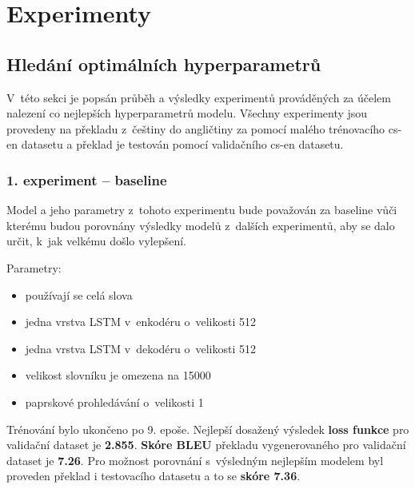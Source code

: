 \section{Experimenty}

\subsection{Hledání optimálních hyperparametrů}\label{subsection:experimentsOptimal}
V~této sekci je popsán průběh a výsledky experimentů prováděných za účelem nalezení co nejlepších hyperparametrů modelu. Všechny experimenty jsou provedeny na překladu z~češtiny do angličtiny za pomocí malého trénovacího cs-en datasetu a překlad je testován pomocí validačního cs-en datasetu.

\subsubsection{1. experiment -- baseline}\label{experiment1}
Model a jeho parametry z~tohoto experimentu bude považován za baseline vůči kterému budou porovnány výsledky modelů z~dalších experimentů, aby se dalo určit, k~jak velkému došlo vylepšení.

Parametry:
\begin{itemize}
  \item používají se celá slova
  \item jedna vrstva LSTM v~enkodéru o~velikosti 512
  \item jedna vrstva LSTM v~dekodéru o~velikosti 512
  \item velikost slovníku je omezena na 15000
  \item paprskové prohledávání o~velikosti 1
\end{itemize}

Trénování bylo ukončeno po 9. epoše. Nejlepší dosažený výsledek \textbf{loss funkce} pro validační dataset je \textbf{2.855}. \textbf{Skóre BLEU} překladu vygenerovaného pro validační dataset je \textbf{7.26}. Pro možnost porovnání s~výsledným nejlepším modelem byl proveden překlad i testovacího datasetu a to se \textbf{skóre 7.36}.

